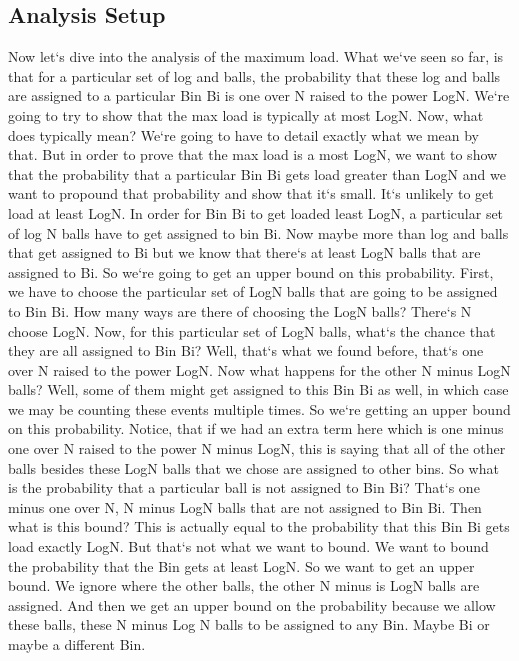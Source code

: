 \subsection{Analysis Setup}
Now let`s dive into the analysis of the maximum load.
What we`ve seen so far, is that for a particular set of log and balls, the probability that these log and balls are assigned to a particular Bin Bi is one over N raised to the power LogN\@.
We`re going to try to show that the max load is typically at most LogN\@.
Now, what does typically mean? We`re going to have to detail exactly what we mean by that.
But in order to prove that the max load is a most LogN, we want to show that the probability that a particular Bin Bi gets load greater than LogN and we want to propound that probability and show that it`s small.
It`s unlikely to get load at least LogN\@.
In order for Bin Bi to get loaded least LogN, a particular set of log N balls have to get assigned to bin Bi.
Now maybe more than log and balls that get assigned to Bi but we know that there`s at least LogN balls that are assigned to Bi.
So we`re going to get an upper bound on this probability.
First, we have to choose the particular set of LogN balls that are going to be assigned to Bin Bi.
How many ways are there of choosing the LogN balls? There`s N choose LogN\@.
Now, for this particular set of LogN balls, what`s the chance that they are all assigned to Bin Bi? Well, that`s what we found before, that`s one over N raised to the power LogN\@.
Now what happens for the other N minus LogN balls? Well, some of them might get assigned to this Bin Bi as well, in which case we may be counting these events multiple times.
So we`re getting an upper bound on this probability.
Notice, that if we had an extra term here which is one minus one over N raised to the power N minus LogN, this is saying that all of the other balls besides these LogN balls that we chose are assigned to other bins.
So what is the probability that a particular ball is not assigned to Bin Bi? That`s one minus one over N, N minus LogN balls that are not assigned to Bin Bi.
Then what is this bound? This is actually equal to the probability that this Bin Bi gets load exactly LogN\@.
But that`s not what we want to bound.
We want to bound the probability that the Bin gets at least LogN\@.
So we want to get an upper bound.
We ignore where the other balls, the other N minus is LogN balls are assigned.
And then we get an upper bound on the probability because we allow these balls, these N minus Log N balls to be assigned to any Bin.
Maybe Bi or maybe a different Bin.
